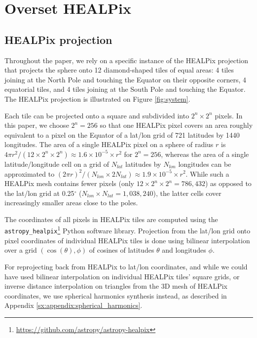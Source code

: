 \documentclass[11pt, a4paper, logo, copyright, numbering]{googledeepmind}
\begin{document}
\section{Overset HEALPix}
\label{sx:appendix:overset_healpix}
\subsection{HEALPix projection}

Throughout the paper, we rely on a specific instance of the HEALPix projection that projects the sphere onto 12 diamond-shaped tiles of equal areas: 4 tiles joining at the North Pole and touching the Equator on their opposite corners, 4 equatorial tiles, and 4 tiles joining at the South Pole and touching the Equator. The HEALPix projection is illustrated on Figure \ref{fig:system}.

Each tile can be projected onto a square and subdivided into $2^n \times 2^n$ pixels. In this paper, we choose $2^n = 256$ so that one HEALPix pixel covers an area roughly equivalent to a pixel on the Equator of a lat/lon grid of 721 latitudes by 1440 longitudes.
The area of a single HEALPix pixel on a sphere of radius $r$ is $4 \pi r^2 / (12 \times 2^n \times 2^n) \approx 1.6 \times 10^{-5} \times r^2$ for $2^n = 256$, whereas the area of a single latitude/longitude cell on a grid of $N_{lat}$ latitudes by $N_{lon}$ longitudes can be approximated to $(2 \pi r)^2 / (N_{lon} \times 2 N_{lat}) \approx 1.9 \times 10^{-5} \times r^2$. While such a HEALPix mesh contains fewer pixels (only $12 \times 2^n \times 2^n = 786,432$) as opposed to the lat/lon grid at 0.25$^\circ$ ($N_{lon} \times N_{lat} = 1,038,240$), the latter cells cover increasingly smaller areas close to the poles.

The coordinates of all pixels in HEALPix tiles are computed using the {\tt astropy\_healpix}\footnote{\url{https://github.com/astropy/astropy-healpix}} Python software library. Projection from the lat/lon grid onto pixel coordinates of individual HEALPix tiles is done using bilinear interpolation over a grid $(\cos(\theta), \phi)$ of cosines of latitudes $\theta$ and longitudes $\phi$.

For reprojecting back from HEALPix to lat/lon coordinates, and while we could have used bilinear interpolation on individual HEALPix tiles' square grids, or inverse distance interpolation on triangles from the 3D mesh of HEALPix coordinates, we use spherical harmonics synthesis instead, as described in Appendix \ref{sx:appendix:spherical_harmonics}.
\end{document}

